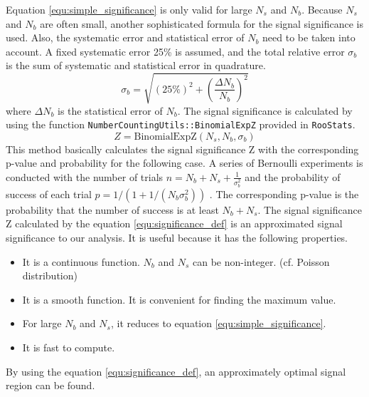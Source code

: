 Equation \ref{equ:simple_significance} is only valid for large $N_s$ and $N_b$.
Because $N_s$ and $N_b$ are often small, another sophisticated formula for the signal significance is used.
Also, the systematic error and statistical error of $N_b$ need to be taken into account.
A fixed systematic error 25\% is assumed, and the total relative error $\sigma_b$ is the sum of systematic and statistical error in quadrature.
\begin{equation}
\sigma_b = \sqrt{(25\%)^2 + (\frac{\Delta N_b}{N_b})^2}
\end{equation}
where $\Delta N_b$ is the statistical error of $N_b$.
The signal significance is calculated by using the function \texttt{NumberCountingUtils::BinomialExpZ} provided in \texttt{RooStats}.
\begin{equation}
Z = \text{BinomialExpZ}(N_s,N_b,\sigma_b)
\label{equ:significance_def}
\end{equation}
This method basically calculates the signal significance Z with the corresponding p-value and probability for the following case.
A series of Bernoulli experiments is conducted with the number of trials $n = N_b + N_s + \frac{1}{\sigma_b ^2}$ and the probability of success of each trial $p = 1/(1 + 1/(N_b \sigma_b ^2))$ \cite{2-leptons-long}.
The corresponding p-value is the probability that the number of success is at least $N_b + N_s$.
The signal significance Z calculated by the equation \ref{equ:significance_def} is an approximated signal significance to our analysis.
It is useful because it has the following properties.
\begin{itemize}
\item It is a continuous function. $N_b$ and $N_s$ can be non-integer. (cf. Poisson distribution)
\item It is a smooth function. It is convenient for finding the maximum value.
\item For large $N_b$ and $N_s$, it reduces to equation \ref{equ:simple_significance}.
\item It is fast to compute.
\end{itemize}
By using the equation \ref{equ:significance_def}, an approximately optimal signal region can be found.

